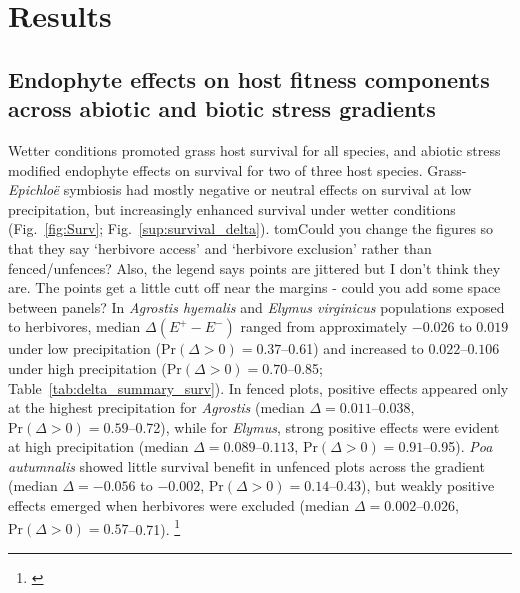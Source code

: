 \documentclass[12pt]{article}\usepackage[]{graphicx}\usepackage[dvipsnames]{xcolor}
\newcommand{\tom}[2]{{\color{red}{#1}}\footnote{\textit{\color{red}{#2}}}}
\begin{document}
\section*{Results}
\subsection*{Endophyte effects on host fitness components across abiotic and biotic stress gradients}

Wetter conditions promoted grass host survival for all species, and abiotic stress modified endophyte effects on survival for two of three host species. 
Grass-\textit{Epichloë} symbiosis had mostly negative or neutral effects on survival at low precipitation, but increasingly enhanced survival under wetter conditions (Fig.~\ref{fig:Surv}; Fig.~\ref{sup:survival_delta}).
tom{}{Could you change the figures so that they say `herbivore access' and `herbivore exclusion' rather than fenced/unfences? Also, the legend says points are jittered but I don't think they are. The points get a little cutt off near the margins - could you add some space between panels? }
In \textit{Agrostis hyemalis} and \textit{Elymus virginicus} populations exposed to herbivores, median $\Delta(E^{+} - E^{-})$ ranged from approximately $-0.026$ to $0.019$ under low precipitation ($\mathrm{Pr}(\Delta>0)=0.37$--0.61) and increased to $0.022$--$0.106$ under high precipitation ($\mathrm{Pr}(\Delta>0)=0.70$--0.85; Table~\ref{tab:delta_summary_surv}). 
In fenced plots, positive effects appeared only at the highest precipitation for \textit{Agrostis} (median $\Delta=0.011$--$0.038$, $\mathrm{Pr}(\Delta>0)=0.59$--0.72), while for \textit{Elymus}, strong positive effects were evident at high precipitation (median $\Delta=0.089$--$0.113$, $\mathrm{Pr}(\Delta>0)=0.91$--0.95).
\textit{Poa autumnalis} showed little survival benefit in unfenced plots across the gradient (median $\Delta=-0.056$ to $-0.002$, $\mathrm{Pr}(\Delta>0)=0.14$--0.43), but weakly positive effects emerged when herbivores were excluded (median $\Delta=0.002$--$0.026$, $\mathrm{Pr}(\Delta>0)=0.57$--0.71).
\tom{}{I am working quickly through the results so that I can get this back to you, but I think we need to be a little more careful in describing costs and benefits since the credible intervals for delta mostly overlap zero. I can help with this on the next edit.}
\end{document}

